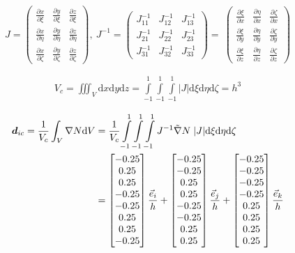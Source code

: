 \documentclass[11pt]{article}
\def\bbf#1{\mathchoice{\hbox{\boldmath$\displaystyle#1$}}
{\hbox{\boldmath$\textstyle#1$}} {\hbox{\boldmath$\scriptstyle#1$}} {\hbox{\boldmath$\scriptscriptstyle#1$}} }
\newcommand{\Vc}{V_c}
\newcommand{\dic}{\bbf{d}_{ic}}
\newcommand{\xxi}{\frac{\partial x}{\partial \xi}}
\newcommand{\yxi}{\frac{\partial y}{\partial \xi}}
\newcommand{\zxi}{\frac{\partial z}{\partial \xi}}
\newcommand{\xeta}{\frac{\partial x}{\partial \eta}}
\newcommand{\yeta}{\frac{\partial y}{\partial \eta}}
\newcommand{\zeeta}{\frac{\partial z}{\partial \eta}}
\newcommand{\xzeta}{\frac{\partial x}{\partial \zeta}}
\newcommand{\yzeta}{\frac{\partial y}{\partial \zeta}}
\newcommand{\zzeta}{\frac{\partial z}{\partial \zeta}}
\newcommand{\xix}{\frac{\partial \xi}{\partial x}}
\newcommand{\xiy}{\frac{\partial \xi}{\partial y}}
\newcommand{\xiz}{\frac{\partial \xi}{\partial z}}
\newcommand{\etax}{\frac{\partial \eta}{\partial x}}
\newcommand{\etay}{\frac{\partial \eta}{\partial y}}
\newcommand{\etaz}{\frac{\partial \eta}{\partial z}}
\newcommand{\zetax}{\frac{\partial \zeta}{\partial x}}
\newcommand{\zetay}{\frac{\partial \zeta}{\partial y}}
\newcommand{\zetaz}{\frac{\partial \zeta}{\partial z}}
\newcommand{\md}{\mbox{d}}
\newcommand{\Int}{\int\limits}
\begin{document}
\begin{enumerate}
\begin{equation*}
	J =
	\begin{pmatrix}
	\xxi & \yxi  & \zxi   \\
	\xeta & \yeta & \zeeta   \\
	\xzeta & \yzeta & \zzeta  
	\end{pmatrix},\:
	J^{-1} =
	\begin{pmatrix}
	J_{11}^{-1} & J_{12}^{-1}  &  J_{13}^{-1}  \\
	J_{21}^{-1} & J_{22}^{-1} & J_{23}^{-1}   \\
	J_{31}^{-1} & J_{32}^{-1} & J_{33}^{-1}  
	\end{pmatrix} =\:
	\begin{pmatrix}
	\xix & \etax  & \zetax   \\
	\xiy & \etay & \zetay   \\
	\xiz & \etaz & \zetaz  
	\end{pmatrix}
\end{equation*} 

	\begin{align*}
	\Vc = \iiint_V \md x \md y \md z = \Int_{-1}^{1}  \Int_{-1}^{1} \Int_{-1}^{1} |J| \md \xi \md \eta \md \zeta = h^3
	\end{align*}
	
	\begin{align*}
	\dic = \frac{1}{\Vc}\int_V \nabla N \md V 
	&= \frac{1}{\Vc} \Int_{-1}^{1}\Int_{-1}^{1}\Int_{-1}^{1} J^{-1} \tilde{\nabla} N\;  |J|\md \xi \md \eta \md \zeta \\
	&= \left[
	\begin{array}{@{}c@{}}
	-0.25 \\
	0.25 \\
	0.25 \\
	-0.25 \\
	-0.25 \\
	0.25 \\
	0.25 \\
	-0.25 
	\end{array} 
	\right] \frac{\vec e_i}{h}
	+\left[
	\begin{array}{@{}c@{}}
	-0.25 \\
	-0.25 \\
	0.25 \\
	0.25 \\
	-0.25 \\
	-0.25 \\
	0.25 \\
	0.25 
	\end{array} 
	\right] \frac{\vec e_j}{h}
	+\left[
	\begin{array}{@{}c@{}}
	-0.25 \\
	-0.25 \\
	-0.25 \\
	-0.25 \\
	0.25 \\
	0.25 \\
	0.25 \\
	0.25 
	\end{array} 
	\right] \frac{\vec e_k}{h}
	\end{align*}




\end{enumerate}
\end{document}
